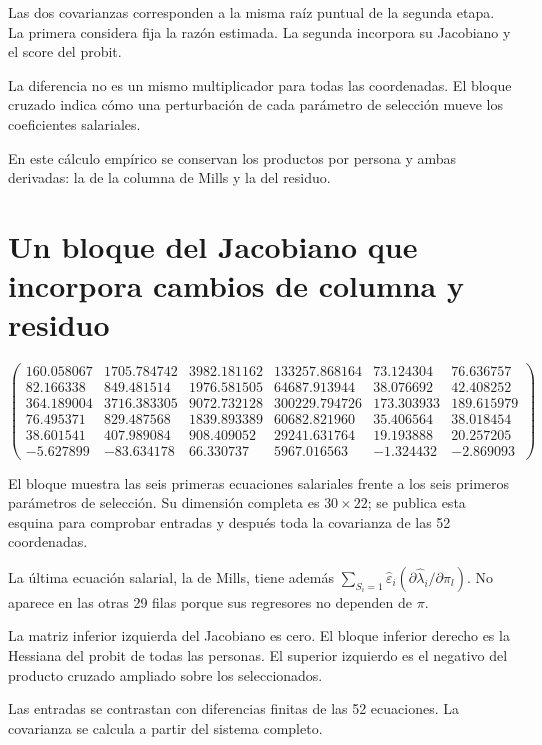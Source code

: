 \documentclass[11pt,a4paper]{article}
\begin{document}
Las dos covarianzas corresponden a la misma raíz puntual de la segunda etapa. La primera considera fija la razón estimada. La segunda incorpora su Jacobiano y el score del probit.

La diferencia no es un mismo multiplicador para todas las coordenadas. El bloque cruzado indica cómo una perturbación de cada parámetro de selección mueve los coeficientes salariales.

En este cálculo empírico se conservan los productos por persona y ambas derivadas: la de la columna de Mills y la del residuo.

\clearpage
\section{Un bloque del Jacobiano que incorpora cambios de columna y residuo}

\[
\begin{pmatrix}160.058067 & 1705.784742 & 3982.181162 & 133257.868164 & 73.124304 & 76.636757\\82.166338 & 849.481514 & 1976.581505 & 64687.913944 & 38.076692 & 42.408252\\364.189004 & 3716.383305 & 9072.732128 & 300229.794726 & 173.303933 & 189.615979\\76.495371 & 829.487568 & 1839.893389 & 60682.821960 & 35.406564 & 38.018454\\38.601541 & 407.989084 & 908.409052 & 29241.631764 & 19.193888 & 20.257205\\-5.627899 & -83.634178 & 66.330737 & 5967.016563 & -1.324432 & -2.869093\end{pmatrix}
\]

El bloque muestra las seis primeras ecuaciones salariales frente a los seis primeros parámetros de selección. Su dimensión completa es $30\times22$; se publica esta esquina para comprobar entradas y después toda la covarianza de las 52 coordenadas.

La última ecuación salarial, la de Mills, tiene además
$\sum_{S_i=1}\widehat\varepsilon_i
(\partial\widehat\lambda_i/\partial\pi_l)$.
No aparece en las otras 29 filas porque sus regresores no dependen de $\pi$.

La matriz inferior izquierda del Jacobiano es cero. El bloque inferior derecho es la Hessiana del probit de todas las personas. El superior izquierdo es el negativo del producto cruzado ampliado sobre los seleccionados.

Las entradas se contrastan con diferencias finitas de las 52 ecuaciones. La covarianza se calcula a partir del sistema completo.
\end{document}
